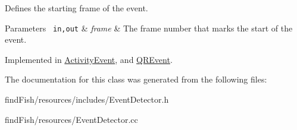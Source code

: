 Defines the starting frame of the event. 
\begin{DoxyParams}[1]{Parameters}
\mbox{\texttt{ in,out}}  & {\em frame} & The frame number that marks the start of the event. \\
\hline
\end{DoxyParams}


Implemented in \mbox{\hyperlink{class_activity_event_a949f9ddfc7c259c1b46a38bc9e1a7d47}{Activity\+Event}}, and \mbox{\hyperlink{class_q_r_event_a1b70ce260e6c326d67f95d7999b76519}{Q\+R\+Event}}.



The documentation for this class was generated from the following files\+:\begin{DoxyCompactItemize}
\item 
find\+Fish/resources/includes/Event\+Detector.\+h\item 
find\+Fish/resources/Event\+Detector.\+cc\end{DoxyCompactItemize}

